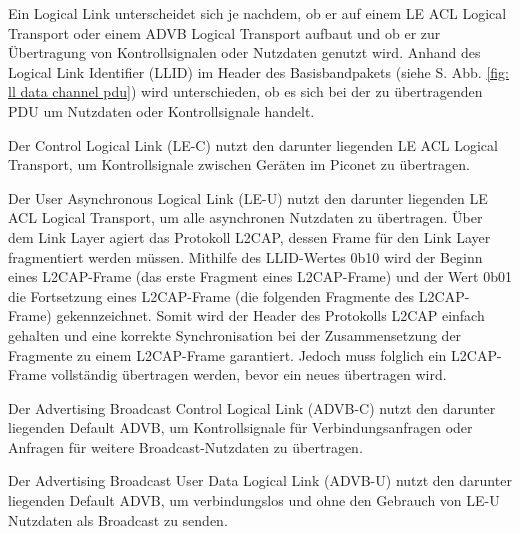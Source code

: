 Ein Logical Link unterscheidet sich je nachdem, ob er auf einem LE ACL Logical Transport oder einem ADVB Logical Transport aufbaut und ob er zur Übertragung von Kontrollsignalen oder Nutzdaten genutzt wird. Anhand des Logical Link Identifier (LLID) im Header des Basisbandpakets (siehe S. \pageref{fig: ll data channel pdu} Abb. \ref{fig: ll data channel pdu}) wird unterschieden, ob es sich bei der zu übertragenden PDU um Nutzdaten oder Kontrollsignale handelt.

Der Control Logical Link (LE-C) nutzt den darunter liegenden LE ACL Logical Transport, um Kontrollsignale zwischen Geräten im Piconet zu übertragen.

Der User Asynchronous Logical Link (LE-U) nutzt den darunter liegenden LE ACL Logical Transport, um alle asynchronen Nutzdaten zu übertragen. Über dem Link Layer agiert das Protokoll L2CAP, dessen Frame für den Link Layer fragmentiert werden müssen. Mithilfe des LLID-Wertes 0b10 wird der Beginn eines L2CAP-Frame (das erste Fragment eines L2CAP-Frame) und der Wert 0b01 die Fortsetzung eines L2CAP-Frame (die folgenden Fragmente des L2CAP-Frame) gekennzeichnet. Somit wird der Header des Protokolls L2CAP einfach gehalten und eine korrekte Synchronisation bei der Zusammensetzung der Fragmente zu einem L2CAP-Frame garantiert. Jedoch muss folglich ein L2CAP-Frame vollständig übertragen werden, bevor ein neues übertragen wird.

Der Advertising Broadcast Control Logical Link (ADVB-C) nutzt den darunter liegenden Default ADVB, um Kontrollsignale für Verbindungsanfragen oder Anfragen für weitere Broadcast-Nutzdaten zu übertragen.

Der Advertising Broadcast User Data Logical Link (ADVB-U) nutzt den darunter liegenden Default ADVB, um verbindungslos und ohne den Gebrauch von LE-U Nutzdaten als Broadcast zu senden. \cite{BtSpec4.0_176-177}
